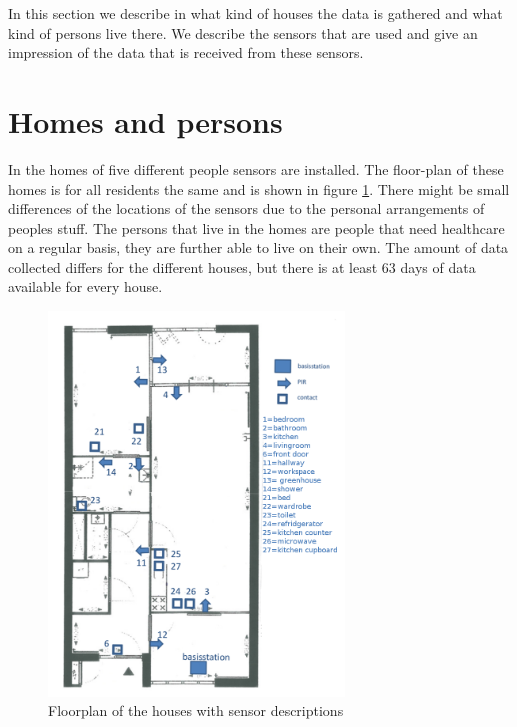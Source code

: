 In this section we describe in what kind of houses the data is gathered and what kind of persons live there. We describe the sensors that are used and give an impression of the data that is received from these sensors.
\section{Homes and persons}
In the homes of five different people sensors are installed. The floor-plan of these homes is for all residents the same and is shown in figure \ref{fig:floorplan}. There might be small differences of the locations of the sensors due to the personal arrangements of peoples stuff.
The persons that live in the homes are people that need healthcare on a regular basis, they are further able to live on their own. The amount of data collected differs for the different houses, but there is at least 63 days of data available for every house.

\begin{figure}[h]
\centering
 \includegraphics[width=0.7\textwidth]{Pictures/floorplan.png}
 \caption{Floorplan of the houses with sensor descriptions}
 \label{fig:floorplan}
\end{figure}


